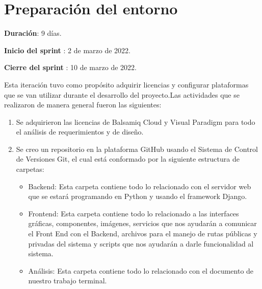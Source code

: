 \clearpage
\section{Preparación del entorno}
    \begin{description}
        \item \textbf{Duración}: 9 días. 
        \item \textbf{Inicio del sprint }: 2 de marzo de 2022.
        \item \textbf{Cierre del sprint }: 10 de marzo de 2022.
    \end{description}
    
    Esta iteración tuvo como propósito adquirir licencias y configurar plataformas que se van utilizar
    durante el desarrollo del proyecto.Las actividades que se realizaron de manera general fueron las siguientes:
    \begin{enumerate}
        \item Se adquirieron las licencias de Balsamiq Cloud y Visual Paradigm  para todo el análisis de
        requerimientos y de diseño.
        \item Se creo un repositorio en la plataforma GitHub usando el Sistema de Control de Versiones Git, el cual está conformado por la siguiente estructura de carpetas:
        \begin{itemize}
            \item Backend: Esta carpeta contiene todo lo relacionado con el servidor web que se estará programando en Python y usando el framework Django.
            \item Frontend: Esta carpeta contiene todo lo relacionado a las interfaces gráficas, componentes, imágenes, servicios que nos ayudarán a comunicar el Front End con el Backend, archivos para el manejo de rutas públicas y privadas del sistema y scripts que nos ayudarán a darle funcionalidad al sistema.
            \item Análisis:  Esta carpeta contiene todo lo relacionado con el documento de nuestro trabajo terminal.
        \end{itemize}
    \end{enumerate}


